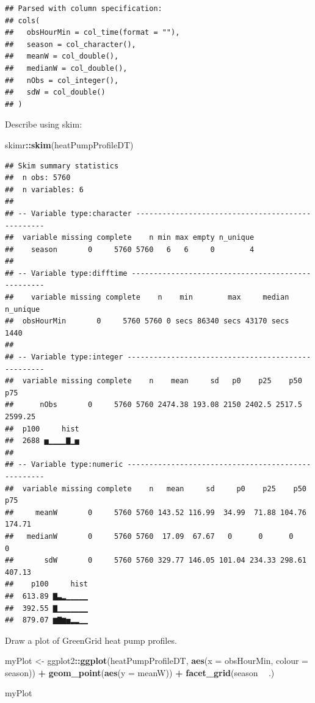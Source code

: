 \documentclass[]{article}
\newenvironment{Shaded}{\begin{snugshade}}{\end{snugshade}}
\newcommand{\KeywordTok}[1]{\textcolor[rgb]{0.13,0.29,0.53}{\textbf{#1}}}
\newcommand{\DataTypeTok}[1]{\textcolor[rgb]{0.13,0.29,0.53}{#1}}
\newcommand{\StringTok}[1]{\textcolor[rgb]{0.31,0.60,0.02}{#1}}
\newcommand{\OperatorTok}[1]{\textcolor[rgb]{0.81,0.36,0.00}{\textbf{#1}}}
\newcommand{\NormalTok}[1]{#1}
\theoremstyle{definition}
\theoremstyle{definition}
\theoremstyle{definition}
\theoremstyle{remark}
\begin{document}
\begin{verbatim}
## Parsed with column specification:
## cols(
##   obsHourMin = col_time(format = ""),
##   season = col_character(),
##   meanW = col_double(),
##   medianW = col_double(),
##   nObs = col_integer(),
##   sdW = col_double()
## )
\end{verbatim}

Describe using skim:

\begin{Shaded}
\begin{Highlighting}[]
\NormalTok{skimr}\OperatorTok{::}\KeywordTok{skim}\NormalTok{(heatPumpProfileDT)}
\end{Highlighting}
\end{Shaded}

\begin{verbatim}
## Skim summary statistics
##  n obs: 5760 
##  n variables: 6 
## 
## -- Variable type:character -------------------------------------------------
##  variable missing complete    n min max empty n_unique
##    season       0     5760 5760   6   6     0        4
## 
## -- Variable type:difftime --------------------------------------------------
##    variable missing complete    n    min        max     median n_unique
##  obsHourMin       0     5760 5760 0 secs 86340 secs 43170 secs     1440
## 
## -- Variable type:integer ---------------------------------------------------
##  variable missing complete    n    mean     sd   p0    p25    p50     p75
##      nObs       0     5760 5760 2474.38 193.08 2150 2402.5 2517.5 2599.25
##  p100     hist
##  2688 ▅▁▁▁▁▇▁▅
## 
## -- Variable type:numeric ---------------------------------------------------
##  variable missing complete    n   mean     sd     p0    p25    p50    p75
##     meanW       0     5760 5760 143.52 116.99  34.99  71.88 104.76 174.71
##   medianW       0     5760 5760  17.09  67.67   0      0      0      0   
##       sdW       0     5760 5760 329.77 146.05 101.04 234.33 298.61 407.13
##    p100     hist
##  613.89 ▇▃▂▁▁▁▁▁
##  392.55 ▇▁▁▁▁▁▁▁
##  879.07 ▆▇▆▅▂▂▁▁
\end{verbatim}

Draw a plot of GreenGrid heat pump profiles.

\begin{Shaded}
\begin{Highlighting}[]
\NormalTok{myPlot <-}\StringTok{ }\NormalTok{ggplot2}\OperatorTok{::}\KeywordTok{ggplot}\NormalTok{(heatPumpProfileDT, }\KeywordTok{aes}\NormalTok{(}\DataTypeTok{x =}\NormalTok{ obsHourMin, }\DataTypeTok{colour =}\NormalTok{ season)) }\OperatorTok{+}
\StringTok{  }\KeywordTok{geom_point}\NormalTok{(}\KeywordTok{aes}\NormalTok{(}\DataTypeTok{y =}\NormalTok{ meanW)) }\OperatorTok{+}
\StringTok{  }\KeywordTok{facet_grid}\NormalTok{(season }\OperatorTok{~}\StringTok{ }\NormalTok{.)}

\NormalTok{myPlot}
\end{Highlighting}
\end{Shaded}
\end{document}
